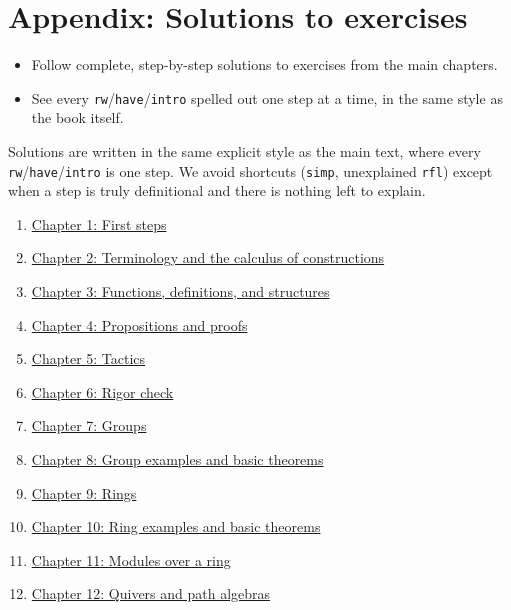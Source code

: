 \chapter*{Appendix: Solutions to exercises}
\setcounter{section}{0}\label{sec:15-appendix-solutions:00-index:1}

\begin{learningobjectives}
\begin{itemize}
\tightlist
\item
  Follow complete, step-by-step solutions to exercises from the main chapters.
\item
  See every \texttt{rw}/\texttt{have}/\texttt{intro} spelled out one step at a time, in the same style as the book itself.
\end{itemize}
\end{learningobjectives}


Solutions are written in the same explicit style as the main text, where every \texttt{rw}/\texttt{have}/\texttt{intro} is one step. We avoid shortcuts (\texttt{simp}, unexplained \texttt{rfl}) except when a step is truly definitional and there is nothing left to explain.


\begin{enumerate}
\def\labelenumi{\arabic{enumi}.}
\tightlist
\item
  \hyperref[sec:15-appendix-solutions:01-chapter-1:1]{Chapter 1: First steps}
\item
  \hyperref[sec:15-appendix-solutions:02-chapter-2:1]{Chapter 2: Terminology and the calculus of constructions}
\item
  \hyperref[sec:15-appendix-solutions:03-chapter-3:1]{Chapter 3: Functions, definitions, and structures}
\item
  \hyperref[sec:15-appendix-solutions:04-chapter-4:1]{Chapter 4: Propositions and proofs}
\item
  \hyperref[sec:15-appendix-solutions:05-chapter-5:1]{Chapter 5: Tactics}
\item
  \hyperref[sec:15-appendix-solutions:06-chapter-6:1]{Chapter 6: Rigor check}
\item
  \hyperref[sec:15-appendix-solutions:07-chapter-7:1]{Chapter 7: Groups}
\item
  \hyperref[sec:15-appendix-solutions:08-chapter-8:1]{Chapter 8: Group examples and basic theorems}
\item
  \hyperref[sec:15-appendix-solutions:09-chapter-9:1]{Chapter 9: Rings}
\item
  \hyperref[sec:15-appendix-solutions:10-chapter-10:1]{Chapter 10: Ring examples and basic theorems}
\item
  \hyperref[sec:15-appendix-solutions:11-chapter-11:1]{Chapter 11: Modules over a ring}
\item
  \hyperref[sec:15-appendix-solutions:12-chapter-12:1]{Chapter 12: Quivers and path algebras}
\end{enumerate}

